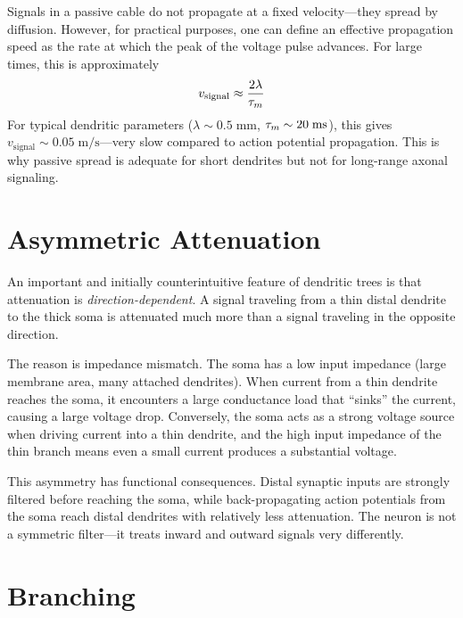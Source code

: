 Signals in a passive cable do not propagate at a fixed velocity---they spread by diffusion. However, for practical purposes, one can define an effective propagation speed as the rate at which the peak of the voltage pulse advances. For large times, this is approximately
%
\begin{equation}
  v_{\text{signal}} \approx \frac{2\lambda}{\tau_m}
  \label{eq:signal-velocity}
\end{equation}
%
For typical dendritic parameters ($\lambda \sim 0.5\;\text{mm}$, $\tau_m \sim 20\;\text{ms}$), this gives $v_{\text{signal}} \sim 0.05\;\text{m/s}$---very slow compared to action potential propagation. This is why passive spread is adequate for short dendrites but not for long-range axonal signaling.

\section{Asymmetric Attenuation}
\label{sec:asymmetric}

An important and initially counterintuitive feature of dendritic trees is that attenuation is \emph{direction-dependent}. A signal traveling from a thin distal dendrite to the thick soma is attenuated much more than a signal traveling in the opposite direction.

The reason is impedance mismatch. The soma has a low input impedance (large membrane area, many attached dendrites). When current from a thin dendrite reaches the soma, it encounters a large conductance load that ``sinks'' the current, causing a large voltage drop. Conversely, the soma acts as a strong voltage source when driving current into a thin dendrite, and the high input impedance of the thin branch means even a small current produces a substantial voltage.

This asymmetry has functional consequences. Distal synaptic inputs are strongly filtered before reaching the soma, while back-propagating action potentials from the soma reach distal dendrites with relatively less attenuation. The neuron is not a symmetric filter---it treats inward and outward signals very differently.

\section{Branching}
\label{sec:branching}


